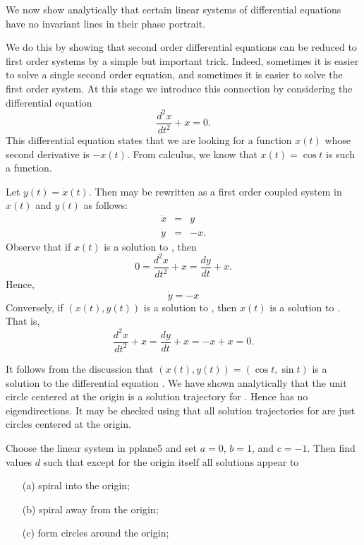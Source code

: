 We now show analytically that certain linear systems of
differential equations have no invariant lines in their phase portrait.

We do this by showing that second order differential equations can be
reduced to first order systems by a simple but important trick.  Indeed,
sometimes it is easier to solve a single second order equation, and
sometimes it is easier to solve the first order system.  At this stage
we introduce this connection by considering the differential equation
\begin{equation}  \label{E:2ndordera}
\frac{d^2x}{dt^2} + x = 0.
\end{equation}
This differential equation states that we are looking for a function
$x(t)$ whose second derivative is $-x(t)$.  From calculus, we know
that $x(t)=\cos t$ is such a function.

Let $y(t)=\dot{x}(t)$.  Then
 may be rewritten as a first order coupled system
in $x(t)$ and $y(t)$ as follows:
\begin{equation}  \label{E:2nd->1st}
\begin{array}{rcl}
\dot{x} & = & y \\
\dot{y} & = & -x.
\end{array}
\end{equation}
Observe that if $x(t)$ is a solution to , then
\[
0 = \frac{d^2x}{dt^2} + x = \frac{dy}{dt} + x.
\]
Hence,
\[
\dot{y} = -x
\]
Conversely, if $(x(t),y(t))$ is a solution to , then
$x(t)$ is a solution to .  That is,
\[
\frac{d^2x}{dt^2} + x = \frac{dy}{dt} + x = -x + x = 0.
\]

It follows from the discussion that $(x(t),y(t))=(\cos t,\sin t)$ is 
a solution to the differential equation .  We have shown 
analytically that the unit circle centered at the origin is a solution 
trajectory for .  Hence  has no 
eigendirections.  It may be checked using \Matlab that all solution 
trajectories for  are just circles centered at the origin.


\EXER

\CEXER

\begin{exercise} \label{c3.5.a01}
Choose the {\sf linear system} in {\sf pplane5} and set $a=0$, $b=1$, and 
$c=-1$.  Then find values $d$ such that except for the origin itself all 
solutions appear to
\begin{itemize}
\item[(a)] spiral into the origin;
\item[(b)] spiral away from the origin;
\item[(c)] form circles around the origin;
\end{itemize}
\end{exercise}

